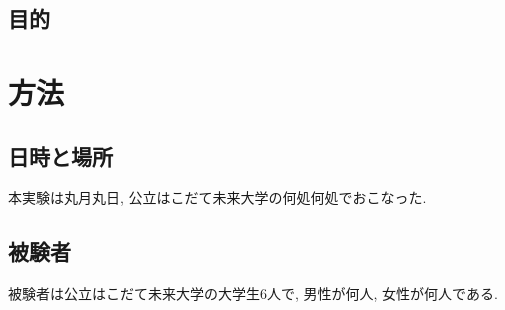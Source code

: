 \documentclass{funthesis}
\begin{document}


\subsection{目的}







\section{方法}
\subsection{日時と場所}

本実験は丸月丸日, 公立はこだて未来大学の何処何処でおこなった. 

\subsection{被験者}
被験者は公立はこだて未来大学の大学生6人で, 男性が何人, 女性が何人である. 
\end{document}
